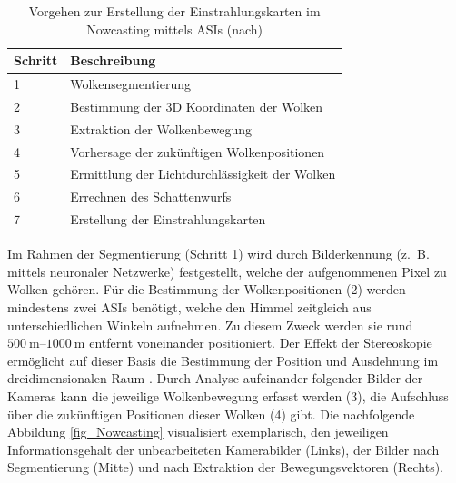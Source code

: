 \begingroup
\renewcommand{\arraystretch}{1.2}
\begin{table}[ht!]
    \caption[Vorgehen zur Erstellung der Einstrahlungskarten im Nowcasting mittels ASIs]{Vorgehen zur Erstellung der Einstrahlungskarten im Nowcasting mittels ASIs (nach\cite[S.4]{Samu})}
    \centering
    \begin{tabular}{m{}m{}}
        \rowcolor{white}
\toprule
        Schritt & Beschreibung                                   \\
        \midrule
        1       & Wolkensegmentierung                            \\
        2       & Bestimmung der 3D Koordinaten der Wolken       \\
        3       & Extraktion der Wolkenbewegung                  \\
        4       & Vorhersage der zukünftigen Wolkenpositionen    \\
        5       & Ermittlung der Lichtdurchlässigkeit der Wolken \\
        6       & Errechnen des Schattenwurfs                    \\
        7       & Erstellung der Einstrahlungskarten             \\
\toprule
    \end{tabular}
    \label{tab_VorgehenNowcasting}
\end{table}
\endgroup

Im Rahmen der Segmentierung (Schritt 1) wird durch Bilderkennung (z.~B. mittels neuronaler Netzwerke) festgestellt, welche der aufgenommenen Pixel zu Wolken gehören.
Für die Bestimmung der Wolkenpositionen (2) werden mindestens zwei ASIs benötigt, welche den Himmel zeitgleich aus unterschiedlichen Winkeln aufnehmen.
Zu diesem Zweck werden sie rund $\SIrange{500}{1000}{\metre}$ entfernt voneinander positioniert.
Der Effekt der Stereoskopie ermöglicht auf dieser Basis die Bestimmung der Position und Ausdehnung im dreidimensionalen Raum \cite[S.5]{Samu}.
Durch Analyse aufeinander folgender Bilder der Kameras kann die jeweilige Wolkenbewegung erfasst werden (3), die Aufschluss über die zukünftigen Positionen dieser Wolken (4) gibt.
Die nachfolgende Abbildung \ref{fig_Nowcasting} visualisiert exemplarisch, den jeweiligen Informationsgehalt der unbearbeiteten Kamerabilder (Links), der Bilder nach Segmentierung (Mitte) und nach Extraktion der Bewegungsvektoren (Rechts).

